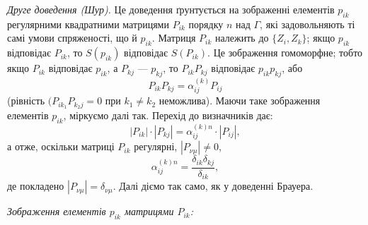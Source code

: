 \documentclass[11pt]{article}
\begin{document}
\emph{Друге доведення (Шур).} Це доведення ґрунтується на зображенні елементів \(p_{ik}\) регулярними квадратними матрицями \(P_{ik}\) порядку \(n\) над \(\Gamma\), які задовольняють ті самі умови спряженості, що й \(p_{ik}\). Матриця \(P_{ik}\) належить до \(\{Z_i,Z_k\}\); якщо \(p_{ik}\) відповідає \(P_{ik}\), то \(S(p_{ik})\) відповідає \(S(P_{ik})\). Це зображення гомоморфне; тобто якщо \(P_{ik}\) відповідає \(p_{ik}\), а \(P_{kj}\) --- \(p_{kj}\), то \(P_{ik}P_{kj}\) відповідає \(p_{ik}p_{kj}\), або
\[
P_{ik}P_{kj}=\alpha_{ij}^{(k)}P_{ij}
\]
(рівність \((P_{ik_1}P_{k_2j}=0\) при \(k_1\neq k_2\) неможлива). Маючи таке зображення елементів \(p_{ik}\), міркуємо далі так. Перехід до визначників дає:
\[
|P_{ik}|\cdot |P_{kj}|=\alpha_{ij}^{(k)n}\cdot |P_{ij}|,
\]
а отже, оскільки матриці \(P_{ik}\) регулярні, \(|P_{\nu\mu}|\ne0\),
\[
\alpha_{ij}^{(k)n}=\frac{\delta_{ik}\delta_{kj}}{\delta_{ik}},
\]
де покладено \(|P_{\nu\mu}|=\delta_{\nu\mu}\). Далі діємо так само, як у доведенні Брауера.

\emph{Зображення елементів \(p_{ik}\) матрицями \(P_{ik}\):}
\end{document}
